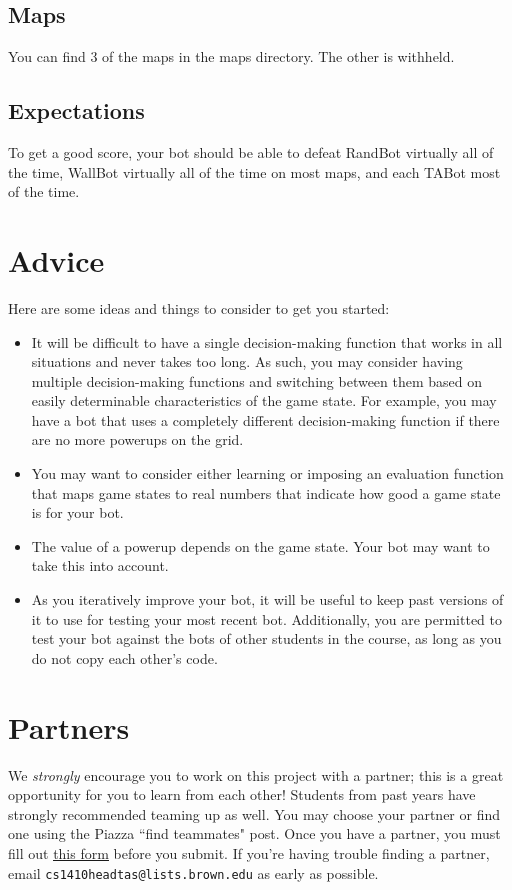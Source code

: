 \documentclass{article}
\begin{document}
\subsection{Maps}
You can find 3 of the maps in the maps directory.
The other is withheld.

\subsection{Expectations}
To get a good score, your bot should be able to defeat RandBot virtually all of the time, WallBot virtually all of the time on most maps, and each TABot most of the time.

\section{Advice}
Here are some ideas and things to consider to get you started:

\begin{itemize}
\item It will be difficult to have a single decision-making function that works in all situations and never takes too long.
As such, you may consider having multiple decision-making functions and switching between them based on easily determinable characteristics of the game state.
For example, you may have a bot that uses a completely different decision-making function if there are no more powerups on the grid.

\item You may want to consider either learning or imposing an evaluation function that maps game states to real numbers that indicate how good a game state is for your bot.

\item The value of a powerup depends on the game state.
Your bot may want to take this into account.

\item As you iteratively improve your bot, it will be useful to keep past versions of it to use for testing your most recent bot.
Additionally, you are permitted to test your bot against the bots of other students in the course, as long as you do not copy each other's code.
\end{itemize}

\section{Partners}
We \textit{strongly} encourage you to work on this project with a partner; this is a great opportunity for you to learn from each other!
Students from past years have strongly recommended teaming up as well.
You may choose your partner or find one using the Piazza ``find teammates" post.
Once you have a partner, you must fill out \href{https://goo.gl/forms/Iw28IP74KXJV6Bcn2}{\underline{this form}} before you submit.
If you're having trouble finding a partner, email \verb|cs1410headtas@lists.brown.edu| as early as possible.
\end{document}
